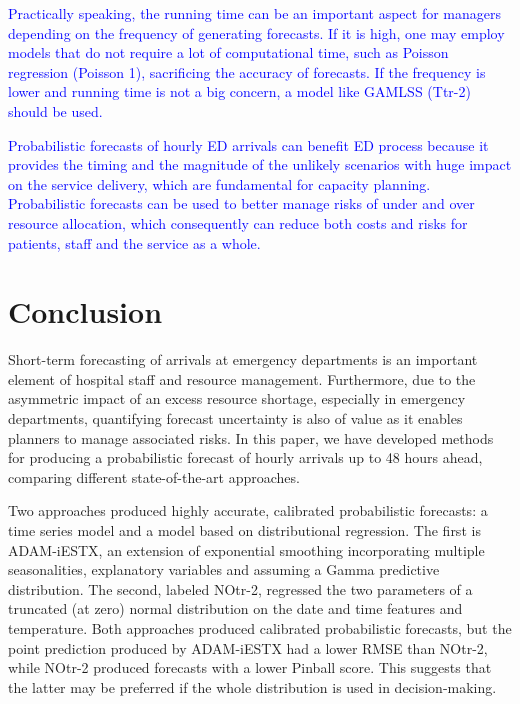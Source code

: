 \documentclass[]{elsarticle} %
\begin{document}
\textcolor{blue}{Practically speaking, the running time can be an important aspect for managers depending
on the frequency of generating forecasts. If it is high, one may employ models that do not
require a lot of computational time, such as Poisson regression (Poisson 1), sacrificing the
accuracy of forecasts. If the frequency is lower and running time is not a big concern, a model
like GAMLSS (Ttr-2) should be used.}

\textcolor{blue}{Probabilistic forecasts of hourly ED arrivals can benefit ED process because it provides the timing and the magnitude of the unlikely scenarios with huge impact on the service delivery, which are fundamental for capacity planning. Probabilistic forecasts can be used to better manage risks of under and over resource allocation, which consequently can reduce both costs and risks for patients, staff and the service as a whole.}

\hypertarget{conclusion}{%
\section{Conclusion}\label{conclusion}}

Short-term forecasting of arrivals at emergency departments is an
important element of hospital staff and resource management.
Furthermore, due to the asymmetric impact of an excess resource
shortage, especially in emergency departments, quantifying forecast
uncertainty is also of value as it enables planners to manage associated
risks. In this paper, we have developed methods for producing a
probabilistic forecast of hourly arrivals up to 48 hours ahead,
comparing different state-of-the-art approaches.

Two approaches produced highly accurate, calibrated probabilistic
forecasts: a time series model and a model based on distributional
regression. The first is ADAM-iESTX, an extension of exponential
smoothing incorporating multiple seasonalities, explanatory variables
and assuming a Gamma predictive distribution. The second, labeled
NOtr-2, regressed the two parameters of a truncated (at zero) normal
distribution on the date and time features and temperature. Both
approaches produced calibrated probabilistic forecasts, but the point
prediction produced by ADAM-iESTX had a lower RMSE than NOtr-2, while
NOtr-2 produced forecasts with a lower Pinball score. This suggests that
the latter may be preferred if the whole distribution is used in
decision-making.
\end{document}
